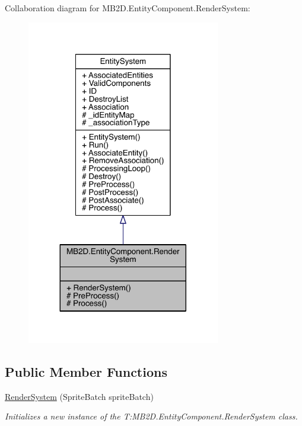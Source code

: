 Collaboration diagram for M\+B2\+D.\+Entity\+Component.\+Render\+System\+:\nopagebreak
\begin{figure}[H]
\begin{center}
\leavevmode
\includegraphics[width=239pt]{class_m_b2_d_1_1_entity_component_1_1_render_system__coll__graph}
\end{center}
\end{figure}
\subsection*{Public Member Functions}
\begin{DoxyCompactItemize}
\item 
\hyperlink{class_m_b2_d_1_1_entity_component_1_1_render_system_a3f09291aad8620444cc5248def8431b2}{Render\+System} (Sprite\+Batch sprite\+Batch)
\begin{DoxyCompactList}\small\item\em Initializes a new instance of the T\+:\+M\+B2\+D.\+Entity\+Component.\+Render\+System class. \end{DoxyCompactList}\end{DoxyCompactItemize}
